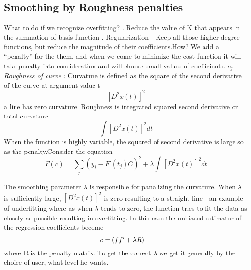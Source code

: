 \documentclass{article}
\begin{document}
\subsection{Smoothing by Roughness penalties} %
What to do if we recognize overfitting? . Reduce the value of K that appears in the summation of basis function . Regularization - Keep all those higher degree functions, but reduce the magnitude of their coefficients.How? We add a ``penalty'' for the them, and when we come to minimize the cost function it will take penalty into consideration and will choose small values of coefficients.   \(c_j\) \newline
\textit{Roughness of curve :} Curvature is defined as the square of the second derivative of the curve at argument value t\[ [D^2x(t)]^2 \] a line has zero curvature. Roughness is integrated squared second derivative or total curvature \[ \int [D^2x(t)]^2 dt\] When the function is highly variable, the squared of second derivative is large so as the penalty.Consider the equation
\[ F(c) = \sum_j(y_j - F'(t_j)C)^2  + \lambda \int [D^2x(t)]^2 dt \]

The smoothing parameter \(\lambda \) is responsible for panalizing the curvature. When \(\lambda \) is sufficiently large, \( [D^2x(t)]^2 \) is zero resulting to a straight line - an example of underfitting where as when \(\lambda \) tends to zero, the function tries to fit the data as closely as possible resulting in overfitting. In this case the unbiased estimator of the regression coefficients become \[ c = (ff`+ \lambda R)^{-1} \] where R is the penalty matrix. To get the correct \(\lambda \) we get it generally by the choice of user, what level he wants.



\end{document}
